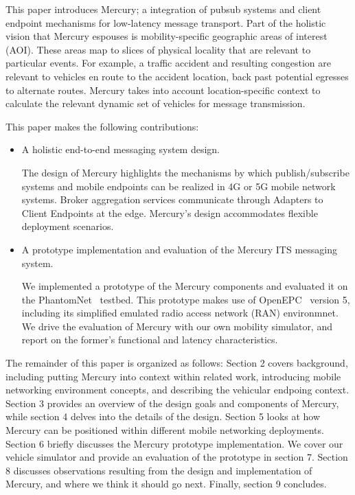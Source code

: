 This paper introduces Mercury; a integration of pubsub systems and
client endpoint mechanisms for low-latency message transport.  Part of
the holistic vision that Mercury espouses is mobility-specific
geographic areas of interest (AOI). These areas map to slices of
physical locality that are relevant to particular events.  For
example, a traffic accident and resulting congestion are relevant to
vehicles en route to the accident location, back past potential
egresses to alternate routes.  Mercury takes into account
location-specific context to calculate the relevant dynamic set of
vehicles for message transmission.

This paper makes the following contributions:
\begin{itemize}

\item A holistic end-to-end messaging system design.

The design of Mercury highlights the mechanisms by which
publish/subscribe systems and mobile endpoints can be realized in 4G
or 5G mobile network systems. Broker aggregation services communicate
through Adapters to Client Endpoints at the edge. Mercury's design
accommodates flexible deployment scenarios.

\item A prototype implementation and evaluation of the Mercury ITS
  messaging system.

We implemented a prototype of the Mercury components and evaluated it
on the PhantomNet~\cite{banerjee2015phantomnet} testbed.  This
prototype makes use of OpenEPC~\cite{corici2010openepc} version 5,
including its simplified emulated radio access network (RAN)
environmnet. We drive the evaluation of Mercury with our own mobility
simulator, and report on the former's functional and latency
characteristics.

\end{itemize}

The remainder of this paper is organized as follows: Section 2 covers
background, including putting Mercury into context within related
work, introducing mobile networking environment concepts, and
describing the vehicular endpoing context. Section 3 provides an
overview of the design goals and components of Mercury, while section
4 delves into the details of the design. Section 5 looks at how
Mercury can be positioned within different mobile networking
deployments.  Section 6 briefly discusses the Mercury prototype
implementation. We cover our vehicle simulator and provide an
evaluation of the prototype in section 7. Section 8 discusses
observations resulting from the design and implementation of Mercury,
and where we think it should go next.  Finally, section 9 concludes.
